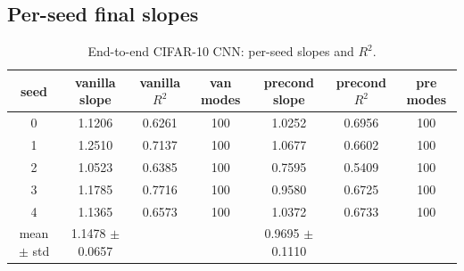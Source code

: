 \subsection*{Per-seed final slopes}
\begin{table}[H]
\centering
\caption{End-to-end CIFAR-10 CNN: per-seed slopes and $R^2$.}
\label{tab:e2e-slopes}
\begin{tabular}{c c c c c c c}
\toprule
seed & vanilla slope & vanilla $R^2$ & van modes & precond slope & precond $R^2$ & pre modes \\
\midrule
0 & 1.1206 & 0.6261 & 100 & 1.0252 & 0.6956 & 100 \\
1 & 1.2510 & 0.7137 & 100 & 1.0677 & 0.6602 & 100 \\
2 & 1.0523 & 0.6385 & 100 & 0.7595 & 0.5409 & 100 \\
3 & 1.1785 & 0.7716 & 100 & 0.9580 & 0.6725 & 100 \\
4 & 1.1365 & 0.6573 & 100 & 1.0372 & 0.6733 & 100 \\
\midrule
mean $\pm$ std & 1.1478 $\pm$ 0.0657 & & & 0.9695 $\pm$ 0.1110 & & \\
\bottomrule
\end{tabular}
\end{table}
